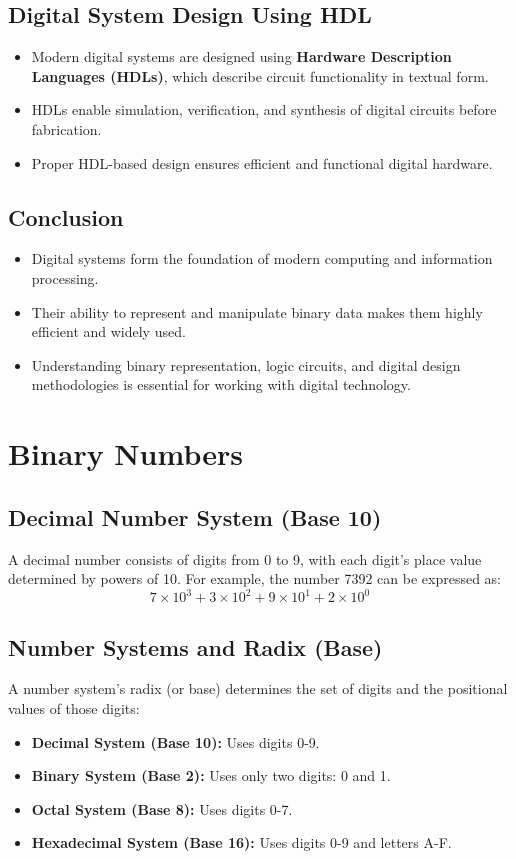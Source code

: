 \documentclass[a4paper,12pt]{article}
\begin{document}
\subsection{Digital System Design Using HDL}
\begin{itemize}
    \item Modern digital systems are designed using \textbf{Hardware Description Languages (HDLs)}, which describe circuit functionality in textual form.
    \item HDLs enable simulation, verification, and synthesis of digital circuits before fabrication.
    \item Proper HDL-based design ensures efficient and functional digital hardware.
\end{itemize}

\subsection{Conclusion}
\begin{itemize}
    \item Digital systems form the foundation of modern computing and information processing.
    \item Their ability to represent and manipulate binary data makes them highly efficient and widely used.
    \item Understanding binary representation, logic circuits, and digital design methodologies is essential for working with digital technology.
\end{itemize}

\newpage

\section{Binary Numbers }
\subsection{Decimal Number System (Base 10)}
A decimal number consists of digits from 0 to 9, with each digit's place value determined by powers of 10.
For example, the number 7392 can be expressed as:
\begin{equation}
  7 \times 10^3 + 3 \times 10^2 + 9 \times 10^1 + 2 \times 10^0
\end{equation}

\subsection{Number Systems and Radix (Base)}
A number system's radix (or base) determines the set of digits and the positional values of those digits:
\begin{itemize}
    \item \textbf{Decimal System (Base 10):} Uses digits 0-9.
    \item \textbf{Binary System (Base 2):} Uses only two digits: 0 and 1.
    \item \textbf{Octal System (Base 8):} Uses digits 0-7.
    \item \textbf{Hexadecimal System (Base 16):} Uses digits 0-9 and letters A-F.
\end{itemize}
\end{document}
